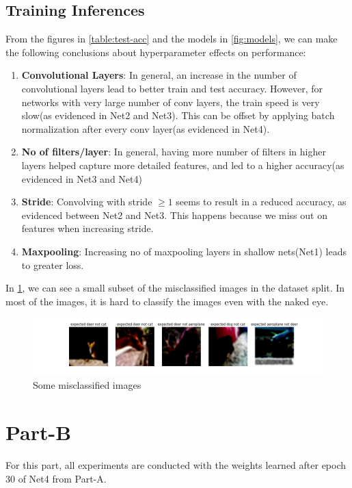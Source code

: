 \documentclass{article}
\begin{document}
\subsection{Training Inferences}
From the figures in \cref{table:test-acc} and the models in \cref{fig:models}, we can make the following conclusions about hyperparameter effects on performance:
\begin{enumerate}
	\item \textbf{Convolutional Layers}: In general, an increase in the number of convolutional layers lead to better train and test accuracy. However, for networks with very large number of conv layers, the train speed is very slow(as evidenced in Net2 and Net3). This can be offset by applying batch normalization after every conv layer(as evidenced in Net4).
	\item \textbf{No of filters/layer}: In general, having more number of filters in higher layers helped capture more detailed features, and led to a higher accuracy(as evidenced in Net3 and Net4)
	\item \textbf{Stride}: Convolving with stride $\geq 1$ seems to result in a reduced accuracy, as evidenced between Net2 and Net3. This happens because we miss out on features when increasing stride.
	\item \textbf{Maxpooling}: Increasing no of maxpooling layers in shallow nets(Net1) leads to greater loss.
\end{enumerate}
In \cref{fig:misclf5}, we can see a small subset of the misclassified images in the dataset split. In most of the images, it is hard to classify the images even with the naked eye.
\begin{figure}[ht]
	\centering
	\includegraphics[scale=0.4]{../code/images/misclassified_imgs.png}
	\caption{Some misclassified images}
	\label{fig:misclf5}
\end{figure}

\section{Part-B}
For this part, all experiments are conducted with the weights learned after epoch $30$ of Net4 from Part-A. 
\end{document}
